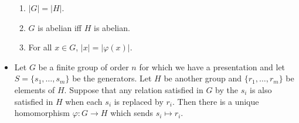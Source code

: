 \documentclass[../notes.tex]{subfiles}
\begin{document}
\begin{itemize}
    \begin{enumerate}
        \item $|G|=|H|$.
        \item $G$ is abelian iff $H$ is abelian.
        \item For all $x\in G$, $|x|=|\varphi(x)|$.
    \end{enumerate}
    \item Let $G$ be a finite group of order $n$ for which we have a presentation and let $S=\{s_1,\dots,s_m\}$ be the generators. Let $H$ be another group and $\{r_1,\dots,r_m\}$ be elements of $H$. Suppose that any relation satisfied in $G$ by the $s_i$ is also satisfied in $H$ when each $s_i$ is replaced by $r_i$. Then there is a unique homomorphism $\varphi:G\to H$ which sends $s_i\mapsto r_i$.
\end{itemize}
\end{document}
